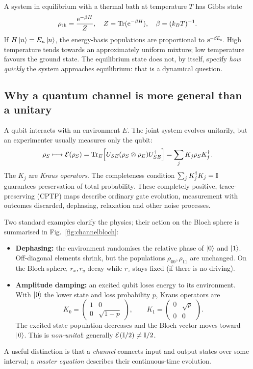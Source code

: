 A system in equilibrium with a thermal bath at temperature $T$ has Gibbs state
\begin{equation}\label{eq:gibbs}
\rho_{\rm th}=\frac{\mathrm{e}^{-\beta H}}{Z},\quad Z=\operatorname{Tr}(\mathrm{e}^{-\beta H}),\quad \beta=(k_BT)^{-1}.
\end{equation}
If $H\left\lvert n\right\rangle=E_n\left\lvert n\right\rangle$, the energy-basis populations are proportional to $\ee^{-\beta E_n}$. High temperature tends towards an approximately uniform mixture; low temperature favours the ground state. The equilibrium state does not, by itself, specify \emph{how quickly} the system approaches equilibrium: that is a dynamical question.

\subsection{Why a quantum channel is more general than a unitary}
A qubit interacts with an environment $E$. The joint system evolves unitarily, but an experimenter usually measures only the qubit:
\begin{equation}\label{eq:channel}
\rho_S\longmapsto \mathcal E(\rho_S)=
\operatorname{Tr}_E\!\left[U_{SE}(\rho_S\otimes\rho_E)U_{SE}^\dagger\right]
=\sum_jK_j\rho_SK_j^\dagger.
\end{equation}
The $K_j$ are \emph{Kraus operators}. The completeness condition $\sum_jK_j^\dagger K_j=\mathbb{I}$ guarantees preservation of total probability. These completely positive, trace-preserving (CPTP) maps describe ordinary gate evolution, measurement with outcomes discarded, dephasing, relaxation and other noise processes.

Two standard examples clarify the physics; their action on the Bloch sphere is summarised in Fig.~\ref{fig:channelbloch}:
\begin{itemize}
\item \textbf{Dephasing:} the environment randomises the relative phase of $\left\lvert 0\right\rangle$ and $\left\lvert 1\right\rangle$. Off-diagonal elements shrink, but the populations $\rho_{00},\rho_{11}$ are unchanged. On the Bloch sphere, $r_x,r_y$ decay while $r_z$ stays fixed (if there is no driving).
\item \textbf{Amplitude damping:} an excited qubit loses energy to its environment. With $\left\lvert 0\right\rangle$ the lower state and loss probability $p$, Kraus operators are
\begin{equation}\label{eq:amplitudedamp}
K_0=\begin{pmatrix}1&0\\0&\sqrt{1-p}\end{pmatrix},\qquad
K_1=\begin{pmatrix}0&\sqrt p\\0&0\end{pmatrix}.
\end{equation}
The excited-state population decreases and the Bloch vector moves toward $\left\lvert 0\right\rangle$. This is \emph{non-unital}: generally $\mathcal E(\mathbb{I}/2)\ne\mathbb{I}/2$.
\end{itemize}
A useful distinction is that a \emph{channel} connects input and output states over some interval; a \emph{master equation} describes their continuous-time evolution.

